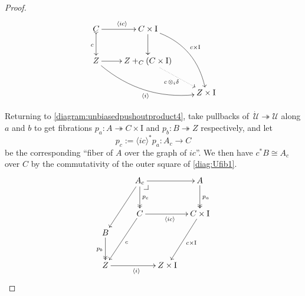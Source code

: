 \documentclass[11pt,reqno]{amsart}
\makeatletter
\newcommand{\fib}{\ensuremath{\twoheadrightarrow}}
\newcommand{\too}{\ensuremath{\longrightarrow}}
\newcommand{\gph}[1]{\ensuremath{\langle #1 \rangle}}
\newcommand{\I}{\ensuremath{\mathrm{I}}}
\newcommand{\U}{\ensuremath{\mathcal{U}}}
\newcommand{\UU}{\ensuremath{\,\dot{\mathcal{U}}}}
\theoremstyle{remark}
\theoremstyle{definition}
\newcommand{\pbcorner}[1][dr]{\save*!/#1-1.2pc/#1:(-1,1)@^{|-}\restore}
\makeatother
\begin{document}
\begin{proof}
\begin{equation}\label{diagram:unbiasedpushoutproduct5}
\xymatrix{
C \ar@{>->}[d]_{c} \ar[r]^{\gph{ic}} & C\times \I \ar[d] \ar@/^4ex/ [rdd]^{c\times\I}\\
Z \ar@/_4ex/ [rrd]_{\gph{i}} \ar[r] &  Z +_C (C\times\I) \ar@{.>}[rd]_{c\, \otimes_i \delta} \\
&& Z\times\I
}
\end{equation}

Returning to \eqref{diagram:unbiasedpushoutproduct4}, take pullbacks of $\UU\fib \U$ along $a$ and $b$ to get fibrations $p_a : A\fib C\times \I$ and $p_b : B\fib Z$ respectively, and let 
\[
p_c :=  \gph{ic}^*p_a : A_c \too C
\]
be the corresponding ``fiber of $A$ over the graph of $ic$''.  We then have $c^*B \cong A_c$ over $C$ by the commutativity of the outer square of \eqref{diag:Ufib1}.
\[
\xymatrix@=1em{
&& \ar[llddd] A_c \ar@{->>}[dd]^{p_c} \ar[rr]  \pbcorner &&  A \ar@{->>}[dd]^{p_a} \\
&& && \\
&& \ar[llddd]^c C \ar[rr]_{\gph{ic}}  &&  \ar[lddd]^{c\times \I} C\times\I \\
B \ar@{->>}[dd]_{p_b} &&&& \\
&&&& \\
Z \ar[rrr]_{\gph{i}} &&& Z\times\I &
}
\]


\end{proof}
\end{document}

